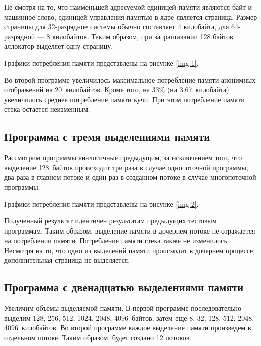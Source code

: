 Не смотря на то, что наименьшей адресуемой единицей памяти являются байт и машинное слово, единицей управления памятью в ядре является страница.
Размер страницы для 32-разрядное системы обычно составляет 4 килобайта, для 64-разрядной --- 8 килобайтов. Таким образом, при запрашивании 128 байтов аллокатор выделяет одну страницу.





Графики потребления памяти представлены на рисунке \ref{img:1}.

Во второй программе увеличилось максимальное потребление памяти анонимных отображений на 20~килобайтов. Кроме того, на 33\% (на 3.67~килобайта) увеличилось среднее потребление памяти кучи. При этом потребление памяти стека остается неизменным.


\subsection{Программа с тремя выделениями памяти}

Рассмотрим программы аналогичные предыдущим, за исключением того, что выделение 128~байтов происходит три раза в случае однопоточной программы, два раза в главном потоке и один раз в созданном потоке в случае многопоточной программы.

Графики потребления памяти представлены на рисунке \ref{img:2}.


Полученный результат идентичен результатам предыдущих тестовым программам. Таким образом, выделение памяти в дочернем потоке не отражается на потреблении памяти. Потребление памяти стека также не изменилось. Несмотря на то, что одно из выделений памяти происходит в дочернем процессе, дополнительная страница не выделяется.

\subsection{Программа с двенадцатью выделениями памяти}

Увеличим объемы выделяемой памяти. В первой программе последовательно выделим 128, 256, 512, 1024, 2048, 4096~байтов, затем еще 8, 32, 128, 512, 2048, 4096~килобайтов. Во второй программе каждое выделение памяти произведем в отдельном потоке. Таким образом, будет создано 12 потоков.

